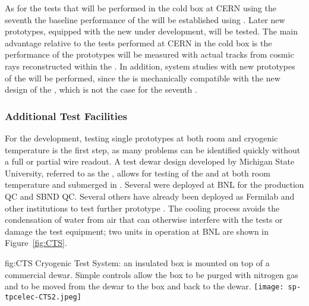 As for the tests that will be performed in the cold box at CERN using the seventh
  the baseline performance of the  
will be established using  . Later new prototypes, equipped
with the new  under development, will be tested. The main advantage
relative to the tests performed at CERN in the cold box is the performance of the
 prototypes will be measured with actual tracks from cosmic rays 
reconstructed within the . In addition, system studies with new 
prototypes of the  will be performed, since the  is
mechanically compatible with the new design of the , which is not
the case for the seventh  .


\subsubsection{Additional Test Facilities}
\label{sec:fdsp-tpcelec-qa-facilities-additional}

For the  development, testing single prototypes at both room and 
cryogenic temperature is the first step, as many problems can be identified 
quickly without a full or partial  wire readout. A test dewar 
design developed by Michigan State University, referred to as the , 
allows for testing of the  and  at both room 
temperature and submerged in \lntwo. Several
 were deployed at BNL for the  production  QC and SBND  QC. Several
others have already been deployed as Fermilab and other institutions to test further prototype .
The  cooling process avoids the condensation of water from air that can otherwise interfere with the 
tests or damage the test equipment; two  units in operation at BNL are shown in Figure~\ref{fig:CTS}.

\begin{dunefigure}
{fig:CTS}
{Cryogenic Test System: an insulated box is mounted on top of a commercial \lntwo dewar.  Simple controls allow the box to be purged with nitrogen gas and \lntwo to be moved from the dewar to the box and back to the dewar.}
\texttt{[image: sp-tpcelec-CTS2.jpeg]}
\end{dunefigure}

